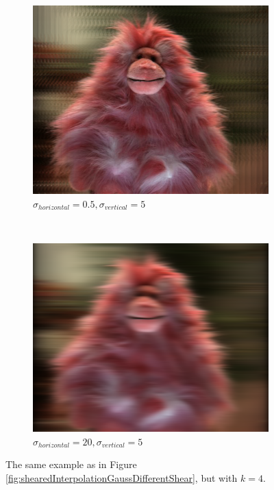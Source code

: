 \documentclass[a4paper]{article}
\begin{document}
\begin{figure}[ht]
	\vspace{2mm}
	\begin{subfigure}[h]{0.48\textwidth}
	  \includegraphics[width=\textwidth]{shearedGauss_k1_shear16_sighor0-5_sigvert5}
	  \caption*{$\sigma_{horizontal} = 0.5, \sigma_{vertical} = 5$}
	\end{subfigure}
    	~
	\begin{subfigure}[h]{0.48\textwidth}
	  \includegraphics[width=\textwidth]{shearedGauss_k1_shear16_sighor20_sigvert5}
	  \caption*{$\sigma_{horizontal} = 20, \sigma_{vertical} = 5$}
	\end{subfigure}
\caption{The same example as in Figure \ref{fig:shearedInterpolationGaussDifferentShear}, but with $k=4$.}
\label{fig:shearedInterpolationGaussDifferentFilterSize1}
\end{figure}
\end{document}
